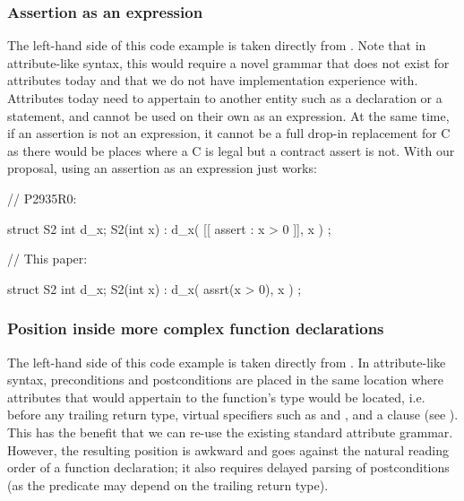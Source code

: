 \subsubsection{Assertion as an expression}

The left-hand side of this code example is taken directly from \cite{P2935R0}. Note that in attribute-like syntax, this would require a novel grammar that does not exist for attributes today and that we do not have implementation experience with. Attributes today need to appertain to another entity such as a declaration or a statement, and cannot be used on their own as an expression. At the same time, if an assertion is not an expression, it cannot be a full drop-in replacement for C  as there would be places where a C  is legal but a contract assert is not. With our proposal, using an assertion as an expression just works:
\vspace{5mm}

\begin{minipage}{8cm}
\begin{codeblock}
// P2935R0:

struct S2 {
  int d_x;
  S2(int x)
    : d_x( [[ assert : x > 0 ]], x )
  {}
};
\end{codeblock}
\end{minipage}
\begin{minipage}{8cm}
\begin{codeblock}
// This paper:

struct S2 {
  int d_x;
  S2(int x)
    : d_x( assrt(x > 0), x )
  {}
};
\end{codeblock}
\end{minipage}

\subsubsection{Position inside more complex function declarations}

The left-hand side of this code example is taken directly from \cite{P2935R0}. In attribute-like syntax, preconditions and postconditions are placed in the same location where attributes that would appertain to the function’s type would be located, i.e. before any trailing return type, virtual specifiers such as  and , and a  clause (see \cite{P2935R0}). This has the benefit that we can re-use the existing standard attribute grammar. However, the resulting position is awkward and goes against the natural reading order of a function declaration; it also requires delayed parsing of postconditions (as the predicate may depend on the trailing return type).

